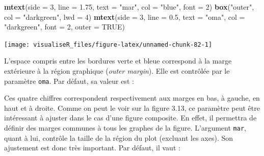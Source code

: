 \documentclass[]{article}
\newenvironment{Shaded}{\begin{snugshade}}{\end{snugshade}}
\newcommand{\CommentTok}[1]{\textcolor[rgb]{0.56,0.35,0.01}{\textit{#1}}}
\newcommand{\DataTypeTok}[1]{\textcolor[rgb]{0.13,0.29,0.53}{#1}}
\newcommand{\DecValTok}[1]{\textcolor[rgb]{0.00,0.00,0.81}{#1}}
\newcommand{\FloatTok}[1]{\textcolor[rgb]{0.00,0.00,0.81}{#1}}
\newcommand{\KeywordTok}[1]{\textcolor[rgb]{0.13,0.29,0.53}{\textbf{#1}}}
\newcommand{\NormalTok}[1]{#1}
\newcommand{\OperatorTok}[1]{\textcolor[rgb]{0.81,0.36,0.00}{\textbf{#1}}}
\newcommand{\OtherTok}[1]{\textcolor[rgb]{0.56,0.35,0.01}{#1}}
\newcommand{\StringTok}[1]{\textcolor[rgb]{0.31,0.60,0.02}{#1}}
\begin{document}
\begin{Shaded}
\begin{Highlighting}[]
\KeywordTok{mtext}\NormalTok{(}\DataTypeTok{side =} \DecValTok{3}\NormalTok{, }\DataTypeTok{line =} \FloatTok{1.75}\NormalTok{, }\DataTypeTok{text =} \StringTok{"mar"}\NormalTok{, }\DataTypeTok{col =} \StringTok{"blue"}\NormalTok{, }\DataTypeTok{font =} \DecValTok{2}\NormalTok{)}
\KeywordTok{box}\NormalTok{(}\StringTok{"outer"}\NormalTok{, }\DataTypeTok{col =} \StringTok{"darkgreen"}\NormalTok{, }\DataTypeTok{lwd =} \DecValTok{4}\NormalTok{)}
\KeywordTok{mtext}\NormalTok{(}\DataTypeTok{side =} \DecValTok{3}\NormalTok{, }\DataTypeTok{line =} \FloatTok{0.5}\NormalTok{, }\DataTypeTok{text =} \StringTok{"oma"}\NormalTok{, }\DataTypeTok{col =} \StringTok{"darkgreen"}\NormalTok{, }\DataTypeTok{font =} \DecValTok{2}\NormalTok{, }\DataTypeTok{outer =} \OtherTok{TRUE}\NormalTok{)}
\end{Highlighting}
\end{Shaded}

\begin{center}\texttt{[image: visualiseR\_files/figure-latex/unnamed-chunk-82-1]} \end{center}

L'espace compris entre les bordures verte et bleue correspond à la marge
extérieure à la région graphique (\emph{outer margin}). Elle est contrôlée par le
paramètre \texttt{oma}. Par défaut, sa valeur est :

\begin{Shaded}
\end{Shaded}

Ces quatre chiffres correspondent respectivement aux marges en bas, à gauche, en haut et à droite. Comme on peut le voir sur la figure 3.13, ce paramètre peut être intéressant à ajuster dans le cas d'une figure composite. En effet, il permettra de définir des marges communes à tous les graphes de la figure.
L'argument \texttt{mar}, quant à lui, contrôle la taille de la région du plot (excluant les axes). Son ajustement est donc très important. Par défaut, il vaut :

\begin{Shaded}
\end{Shaded}
\end{document}
